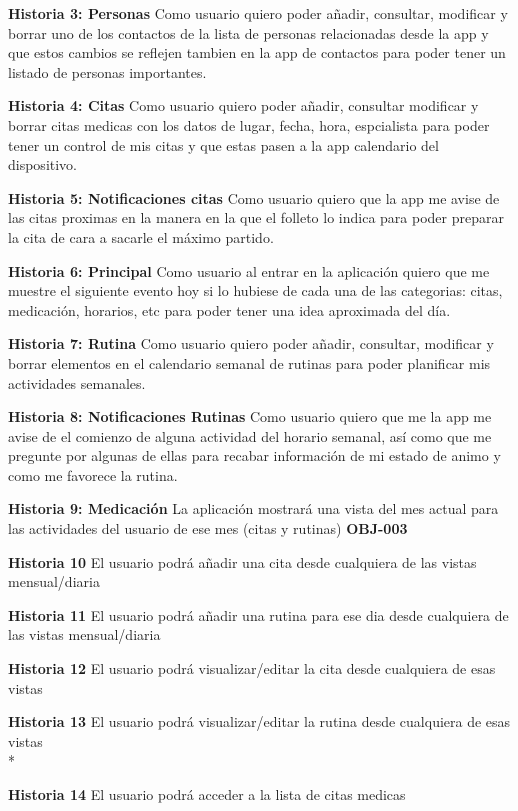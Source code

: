 \documentclass[../pfc.tex]{subfiles}
\begin{document}
	\textbf{Historia 3: Personas}	
		Como usuario quiero poder añadir, consultar, modificar y borrar uno de los contactos de la lista de personas relacionadas desde la app y que estos cambios se reflejen tambien en la app de contactos para poder tener un listado de personas importantes.

	
	\textbf{Historia 4: Citas}	
		Como usuario quiero poder añadir, consultar modificar y borrar citas medicas con los datos de lugar, fecha, hora, espcialista para poder tener un control de mis citas y que estas pasen a la app calendario del dispositivo. 
		
	\textbf{Historia 5: Notificaciones citas}	
		Como usuario quiero que la app me avise de las citas proximas en la manera en la que el folleto lo indica para poder preparar la cita de cara a sacarle el máximo partido.
	
	\textbf{Historia 6: Principal}
		Como usuario al entrar en la aplicación quiero que me muestre el siguiente evento hoy si lo hubiese de cada una de las categorias: citas, medicación, horarios, etc para poder tener una idea aproximada del día.
	
	\textbf{Historia 7: Rutina}
		Como usuario quiero poder añadir, consultar, modificar y borrar elementos en el calendario semanal de rutinas para poder planificar mis actividades semanales.
	
	\textbf{Historia 8: Notificaciones Rutinas}
		Como usuario quiero que me la app me avise de el comienzo de alguna actividad del horario semanal, así como que me pregunte por algunas de ellas para recabar información de mi estado de animo y como me favorece la rutina. 
	
	\textbf{Historia 9: Medicación}	La aplicación mostrará una vista del mes actual para las actividades del usuario de ese mes (citas y rutinas)	\textbf{OBJ-003}
	
	\textbf{Historia 10}	El usuario podrá añadir una cita desde cualquiera de las vistas mensual/diaria
	
	\textbf{Historia 11}	El usuario podrá añadir una rutina para ese dia desde cualquiera de las vistas mensual/diaria
	
	\textbf{Historia 12}	El usuario podrá visualizar/editar la cita desde cualquiera de esas vistas
	

	\textbf{Historia 13}	El usuario podrá visualizar/editar la rutina desde cualquiera de esas vistas\\*

	
	\textbf{Historia 14}	El usuario podrá acceder a la lista de citas medicas
	
\end{document}
